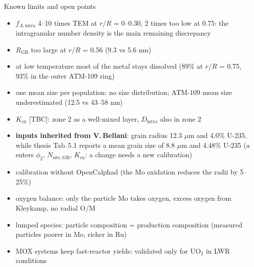 \documentclass[aspectratio=169,10pt]{beamer}
\newcommand{\NEW}[1]{\textcolor{new}{#1}}
\begin{document}
\begin{frame}{Known limits and open points}
  \small
  \begin{itemize}
    \item $f_{A,\mathrm{intra}}$ 4--10 times TEM at $r/R$ = 0--0.30, 2 times too low at 0.75: the intragranular number density is the
      main remaining discrepancy
    \item $R_{\mathrm{GB}}$ too large at $r/R$ = 0.56 (9.3 vs 5.6 nm)
    \item at low temperature most of the metal stays dissolved (89\% at $r/R$ = 0.75, 93\% in the outer ATM-109 ring)
    \item one mean size per population: no size distribution; ATM-109 mean size underestimated (12.5 vs 43--58 nm)
    \item \NEW{$K_{\mathrm{ex}}$ [TBC]: zone 2 as a well-mixed layer, $D_{\mathrm{intra}}$ also in zone 2}
    \item \textbf{inputs inherited from V.\,Bellani}: grain radius 12.3 $\mu$m and 4.0\% U-235, while thesis Tab.\,5.1 reports a mean grain
      size of 8.8 $\mu$m and 4.48\% U-235 ($a$ enters $\phi_2$, $N_{\mathrm{site,GB}}$, $K_{\mathrm{ex}}$: a change needs a new calibration)
    \item calibration without OpenCalphad (the Mo oxidation reduces the radii by 5--25\%)
    \item oxygen balance: only the particle Mo takes oxygen, excess oxygen from Kleykamp, no radial O/M
    \item lumped species: particle composition = production composition (measured particles poorer in Mo, richer in Ru)
    \item MOX systems keep fast-reactor yields: validated only for UO$_2$ in LWR conditions
  \end{itemize}
\end{frame}
\end{document}
